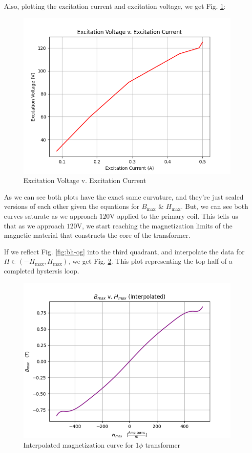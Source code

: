 \documentclass{IEEEtran}
\begin{document}
Also, plotting the excitation current and excitation voltage, we get Fig. \ref{fig:excitation}:

\begin{figure}[h!]
    \includegraphics[width=\columnwidth]{vi-plot.png}
    \caption{Excitation Voltage v. Excitation Current}
    \label{fig:excitation}
\end{figure}

As we can see both plots have the exact same curvature, and they're just scaled versions of each other given the equations for \(B_{\text{max}}\) \& \(H_{\text{max}}\). But, we can see both curves saturate as we approach \(120\)V applied to the primary coil. This tells us that as we approach \(120\)V, we start reaching the magnetization limits of the magnetic material that constructs the core of the transformer.

If we reflect Fig. \ref{fig:bh-og} into the third quadrant, and interpolate the data for \(H \in (-H_{\text{max}}, H_{\text{max}})\), we get Fig. \ref{fig:bh-interp}. This plot representing the top half of a completed hystersis loop.

\begin{figure}[h!]
    \includegraphics[width=\columnwidth]{bh-interp-plot.png}
    \caption{Interpolated magnetization curve for 1\(\phi\) transformer} 
    \label{fig:bh-interp}
\end{figure}
\end{document}
